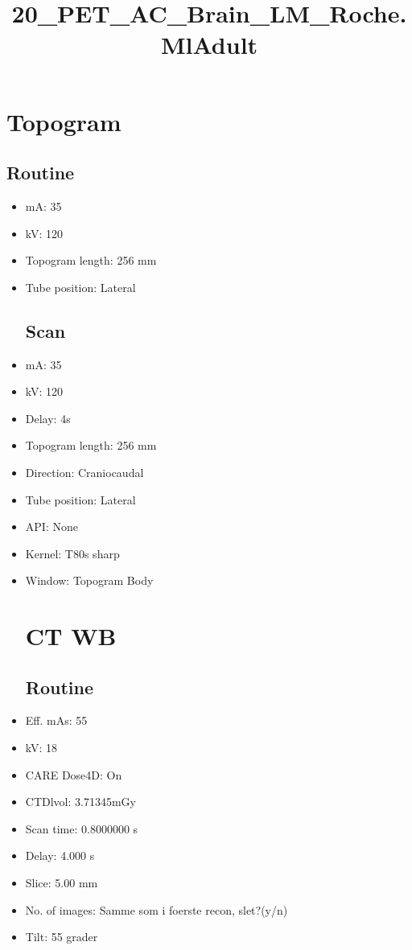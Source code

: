 \documentclass[12pt]{article}
\title{20\_PET\_AC\_Brain\_LM\_Roche.MlAdult}
\begin{document}
\maketitle
\newpage
\tableofcontents
\newpage
{}


\section{Topogram}
\subsection{Routine}
 \begin{itemize}\item mA: 35\item kV: 120\item Topogram length: 256 mm\item Tube position: Lateral
\subsection{Scan}
\item mA: 35\item kV: 120\item Delay: 4s\item Topogram length: 256 mm\item Direction: Craniocaudal\item Tube position: Lateral\item API: None\item Kernel: T80s sharp\item Window: Topogram Body
\section{CT WB}
\subsection{Routine}
\item Eff. mAs: 55\item kV: 18\item CARE Dose4D: On\item CTDlvol: 3.71345mGy\item Scan time: 0.8000000 s\item Delay: 4.000 s\item Slice: 5.00 mm\item No. of images: Samme som i foerste recon, slet?(y/n)\item Tilt: 55 grader

\end{itemize}
\end{document}
